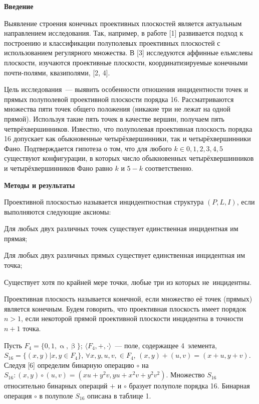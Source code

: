  

\makeProcTitle
{}

\textbf{Введение}

Выявление строения конечных проективных плоскостей является актуальным направлением исследования. Так, например, в работе [1] развивается подход к построению и классификации полуполевых проективных плоскостей с использованием регулярного множества. В [3] исследуются аффинные
ельмслевы плоскости, изучаются проективные плоскости, координатизируемые конечными почти-полями, квазиполями, [2, 4].

Цель исследования~--- выявить особенности отношения инцидентности точек и прямых полуполевой проективной плоскости порядка 16. Рассматриваются множества пяти точек общего положения (никакие три не лежат на одной
прямой). Используя такие пять точек в качестве вершин, получаем пять четврёхвершинников. Известно, что полуполевая проективная плоскость порядка 16 допускает как обыкновенные четырёхвершинники, так и четырёхвершинники Фано. Подтверждается гипотеза о том, что для любого $k \in 0,1,2,3,4,5$ существуют конфигурации, в которых число обыкновенных четырёхвершинников и четырёхвершинников Фано равно $k$ и $5-k$ соответственно.

\textbf{Методы и результаты}

Проективной плоскостью называется инцидентностная структура $(P, L, I)$, если выполняются следующие аксиомы:
\begin{description}[noitemsep]\vspace{-6pt}
\item[А1.] Для любых двух различных точек существует единственная инцидентная им прямая;
\item[А2.] Для любых двух различных прямых существует единственная инцидентная им точка;
\item[А3.] Существует хотя по крайней мере точки, любые три из которых не~инцидентны.
\end{description}\vspace{-8pt}

Проективная плоскость называется конечной, если множество её точек (прямых) является конечным. Будем говорить, что проективная плоскость имеет порядок $n>1$, если некоторой прямой проективной плоскости инцидентна в точности $n+1$ точка.

Пусть $F_4 = \lbrace0,1,\upalpha,\upbeta\rbrace$; $\langle F_4,+,\cdot \rangle$~--- поле, содержащее 4~элемента,\\ $S_{16} = \lbrace (x,y)|x,y \in F_4 \rbrace$, $\forall x,y,u,v, \in F_4$, $(x,y)+(u,v)=(x+u,y+v)$. Следуя [6] определим бинарную операцию $\circ$ на $S_{16} : (x,y)\circ(u,v) = (xu+y^2v, yu+x^2v+y^2v^2)$. Множество $S_{16}$
относительно бинарных операций $+$ и $\circ$ бразует полуполе порядка 16. Бинарная операция $\circ$ в полуполе $S_{16}$ описана в таблице 1.

